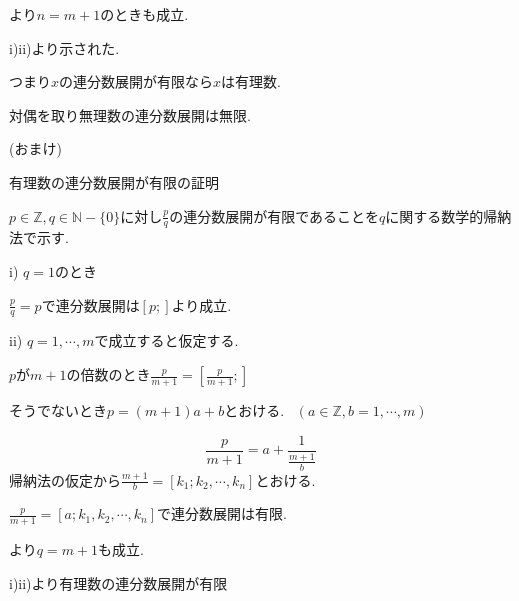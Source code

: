 \documentclass{jsarticle}
\begin{document}
より$n=m+1$のときも成立.

i)ii)より示された.

つまり$x$の連分数展開が有限なら$x$は有理数.

対偶を取り無理数の連分数展開は無限.

(おまけ)

有理数の連分数展開が有限の証明

$p\in\mathbb{Z},q\in \mathbb{N}-\{0\}$に対し$\frac{p}{q}$の連分数展開が有限であることを$q$に関する数学的帰納法で示す.

i) $q=1$のとき

$\frac{p}{q}=p$で連分数展開は$[p;]$より成立.

ii) $q=1,\cdots,m$で成立すると仮定する.

$p$が$m+1$の倍数のとき$\frac{p}{m+1}=[\frac{p}{m+1};]$

そうでないとき$p=(m+1)a+b$とおける. \ $(a\in\mathbb{Z} ,b=1,\cdots,m)$

\[\frac{p}{m+1}=a+\frac{1}{\frac{m+1}{b}}\]
帰納法の仮定から$\frac{m+1}{b}=[k_1;k_2,\cdots,k_n]$とおける.

$\frac{p}{m+1}=[a;k_1,k_2,\cdots,k_n]$で連分数展開は有限.

より$q=m+1$も成立.

i)ii)より有理数の連分数展開が有限
\end{document}
